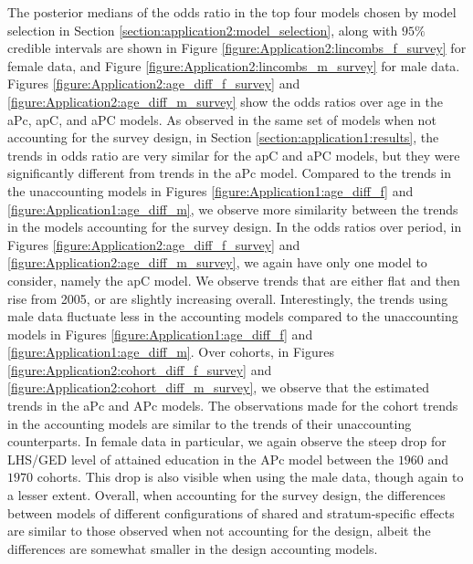 \vspace{-0.2cm}
The posterior medians of the odds ratio in the top four models chosen by model selection in Section \ref{section:application2:model_selection}, along with $95\%$ credible intervals are shown in Figure \ref{figure:Application2:lincombs_f_survey} for female data, and Figure \ref{figure:Application2:lincombs_m_survey} for male data. Figures \ref{figure:Application2:age_diff_f_survey} and \ref{figure:Application2:age_diff_m_survey} show the odds ratios over age in the aPc, apC, and aPC models. As observed in the same set of models when not accounting for the survey design, in Section \ref{section:application1:results}, the trends in odds ratio are very similar for the apC and aPC models, but they were significantly different from trends in the aPc model. Compared to the trends in the unaccounting models in Figures \ref{figure:Application1:age_diff_f} and \ref{figure:Application1:age_diff_m}, we observe more similarity between the trends in the models accounting for the survey design. In the odds ratios over period, in Figures \ref{figure:Application2:age_diff_f_survey} and \ref{figure:Application2:age_diff_m_survey}, we again have only one model to consider, namely the apC model. We observe trends that are either flat and then rise from 2005, or are slightly increasing overall. Interestingly, the trends using male data fluctuate less in the accounting models compared to the unaccounting models in Figures \ref{figure:Application1:age_diff_f} and \ref{figure:Application1:age_diff_m}. Over cohorts, in Figures \ref{figure:Application2:cohort_diff_f_survey} and \ref{figure:Application2:cohort_diff_m_survey}, we observe that the estimated trends in the aPc and APc models. The observations made for the cohort trends in the accounting models are similar to the trends of their unaccounting counterparts. In female data in particular, we again observe the steep drop for LHS/GED level of attained education in the APc model between the $1960$ and $1970$ cohorts. This drop is also visible when using the male data, though again to a lesser extent. Overall, when accounting for the survey design, the differences between models of different configurations of shared and stratum-specific effects are similar to those observed when not accounting for the design, albeit the differences are somewhat smaller in the design accounting models.

